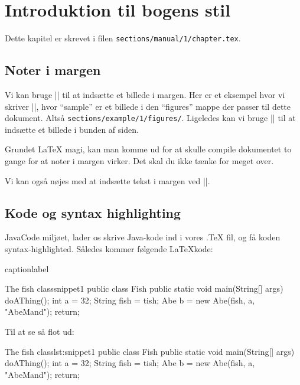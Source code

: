 \chapter{Introduktion til bogens stil}
Dette kapitel er skrevet i filen \texttt{sections/manual/1/chapter.tex}.

\vspace{5mm}

\section{Noter i margen}

Vi kan bruge \LaTeXInline|| til at 
indsætte et billede i margen. Her er et eksempel hvor vi skriver 
\LaTeXInline||, hvor 
``sample'' er et billede i den ``figures'' mappe der passer til dette dokument. 
Altså \texttt{sections/example/1/figures/}. 
Ligeledes kan vi bruge \LaTeXInline||
til at indsætte et billede i bunden af siden.

Grundet \LaTeX\xspace magi, kan man komme ud for at skulle compile dokumentet 
to gange for at noter i margen virker. Det skal du ikke tænke for meget over.

\vspace{1cm}

Vi kan også nøjes med at indsætte tekst i margen ved 
\LaTeXInline||.

\clearpage

\section{Kode og syntax highlighting}

JavaCode miljøet, lader os skrive Java-kode ind i vores .TeX fil, og få koden 
syntax-highlighted. Således kommer følgende \LaTeX kode:
\begin{LaTeXCode}{caption}{label}
\begin{JavaCode}{The fish class}{snippet1}
	public class Fish {
		public static void main(String[] args) {
			doAThing();
			int a = 32;
			String fish = tish;
			Abe b = new Abe(fish, a, "AbeMand");
			return;
		}
	}
\end{JavaCode}
\end{LaTeXCode}
Til at se så flot ud:
\begin{JavaCode}{The fish class}{lst:snippet1}
	public class Fish {
		public static void main(String[] args) {
			doAThing();
			int a = 32;
			String fish = tish;
			Abe b = new Abe(fish, a, "AbeMand");
			return;
		}
	}
\end{JavaCode}

